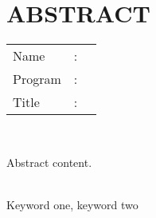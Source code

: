%
%
%

\chapter*{ABSTRACT}
\singlespacing

\vspace*{0.2cm}

\noindent \begin{tabular}{l l p{11.0cm}}
	Name&: & \penulis \\
	Program&: & \program \\
	Title&: & \judulInggris \\
\end{tabular} \\

\vspace*{0.5cm}

\noindent Abstract content. \\

\vspace*{0.2cm}

\noindent {} \\ Keyword one, keyword two \\

\onehalfspacing
\newpage
